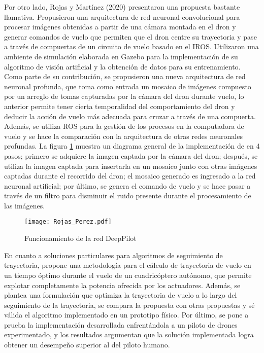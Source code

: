 Por otro lado, Rojas y Martínez (2020)\cite{rojas2020deeppilot} presentaron una propuesta bastante llamativa. Propusieron una arquitectura de red neuronal convolucional para procesar imágenes obtenidas a partir de una cámara montada en el dron y generar comandos de vuelo que permiten que el dron centre su trayectoria y pase a través de compuertas de un circuito de vuelo basado en el IROS. Utilizaron una ambiente de simulación elaborada en Gazebo para la implementación de su algoritmo de visión artificial y la obtención de datos para su entrenamiento. Como parte de su contribución, se propusieron una nueva arquitectura de red neuronal profunda, que toma como entrada un mosaico de imágenes compuesto por un arreglo de tomas capturadas por la cámara del dron durante vuelo, lo anterior permite tener cierta temporalidad del comportamiento del dron y deducir la acción de vuelo más adecuada para cruzar a través de una compuerta.
Además, se utiliza ROS para la gestión de los procesos en la computadora de vuelo y se hace la comparación con la arquitectura de otras redes neuronales profundas. La figura \ref{fig:Rojas_Perez} muestra un diagrama general de la implementación de \cite{rojas2020deeppilot} en 4 pasos; primero se adquiere la imagen captada por la cámara del dron; después, se utiliza la imagen captada para insertarla en un mosaico junto con otras imágenes captadas durante el recorrido del dron; el mosaico generado es ingresado a la red neuronal artificial; por último, se genera el comando de vuelo y se hace pasar a través de un filtro para disminuir el ruido presente durante el procesamiento de las imágenes.

\begin{figure}[ht]
    \centering
    \texttt{[image: Rojas\_Perez.pdf]}
    \caption{Funcionamiento de la red DeepPilot\cite{rojas2020deeppilot}}
    \label{fig:Rojas_Perez}
\end{figure}

En cuanto a soluciones particulares para algoritmos de seguimiento de trayectoria, \cite{foehn2021time} propone una metodología para el cálculo de trayectoria de vuelo en un tiempo óptimo durante el vuelo de un cuadricóptero autónomo, que permite explotar completamente la potencia ofrecida por los actuadores. Además, se plantea una formulación que optimiza la trayectoria de vuelo a lo largo del seguimiento de la trayectoria, se compara la propuesta con otras propuestas y sé válida el algoritmo implementado en un prototipo físico. Por último, se pone a prueba la implementación desarrollada enfrentándola a un piloto de drones experimentado, y los resultados argumentan que la solución implementada logra obtener un desempeño superior al del piloto humano.

